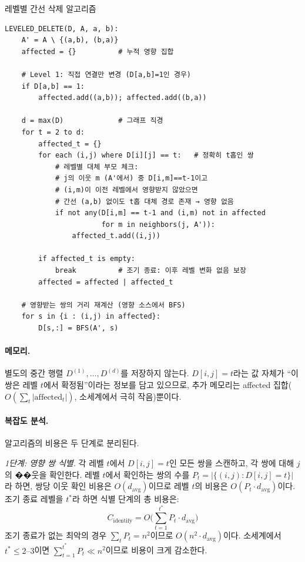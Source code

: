 \documentclass[11pt,a4paper]{article}
\begin{document}
\begin{mathbox}{레벨별 간선 삭제 알고리즘}
\begin{verbatim}
LEVELED_DELETE(D, A, a, b):
    A' = A \ {(a,b), (b,a)}
    affected = {}          # 누적 영향 집합

    # Level 1: 직접 연결만 변경 (D[a,b]=1인 경우)
    if D[a,b] == 1:
        affected.add((a,b)); affected.add((b,a))

    d = max(D)             # 그래프 직경
    for t = 2 to d:
        affected_t = {}
        for each (i,j) where D[i][j] == t:   # 정확히 t홉인 쌍
            # 레벨별 대체 부모 체크:
            # j의 이웃 m (A'에서) 중 D[i,m]==t-1이고
            # (i,m)이 이전 레벨에서 영향받지 않았으면
            # 간선 (a,b) 없이도 t홉 대체 경로 존재 → 영향 없음
            if not any(D[i,m] == t-1 and (i,m) not in affected
                       for m in neighbors(j, A')):
                affected_t.add((i,j))

        if affected_t is empty:
            break          # 조기 종료: 이후 레벨 변화 없음 보장
        affected = affected | affected_t

    # 영향받는 쌍의 거리 재계산 (영향 소스에서 BFS)
    for s in {i : (i,j) in affected}:
        D[s,:] = BFS(A', s)
\end{verbatim}
\end{mathbox}

\paragraph{메모리.}
별도의 중간 행렬 $D^{(1)}, \ldots, D^{(d)}$를 저장하지 않는다. $D[i,j] = t$라는 값 자체가 ``이 쌍은 레벨 $t$에서 확정됨''이라는 정보를 담고 있으므로, 추가 메모리는 affected 집합($O(\sum_t |\text{affected}_t|)$, 소세계에서 극히 작음)뿐이다.

\paragraph{복잡도 분석.}
알고리즘의 비용은 두 단계로 분리된다.

\noindent\textit{1단계: 영향 쌍 식별.}
각 레벨 $t$에서 $D[i,j]=t$인 모든 쌍을 스캔하고, 각 쌍에 대해 $j$의 ��웃을 확인한다. 레벨 $t$에서 확인하는 쌍의 수를 $P_t = |\{(i,j) : D[i,j] = t\}|$라 하면, 쌍당 이웃 확인 비용은 $O(d_{\text{avg}})$이므로 레벨 $t$의 비용은 $O(P_t \cdot d_{\text{avg}})$이다. 조기 종료 레벨을 $t^*$라 하면 식별 단계의 총 비용은:
\[
C_{\text{identify}} = O\!\Bigg(\sum_{t=1}^{t^*} P_t \cdot d_{\text{avg}}\Bigg)
\]
조기 종료가 없는 최악의 경우 $\sum_t P_t = n^2$이므로 $O(n^2 \cdot d_{\text{avg}})$이다. 소세계에서 $t^* \leq 2\text{--}3$이면 $\sum_{t=1}^{t^*} P_t \ll n^2$이므로 비용이 크게 감소한다.
\end{document}

